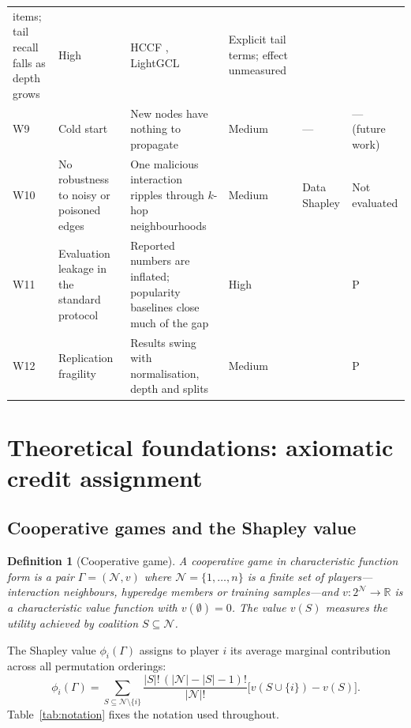 \documentclass[a4paper,fleqn,longmktitle]{cas-dc}
\newtheorem{definition}{Definition}
\begin{document}
\begin{table}[t]
\begin{tabular}{llp{6.5cm}lp{3.0cm}l}
items; tail recall falls as depth grows & High & HCCF \citep{xia2022hccf},
LightGCL \citep{cai2023lightgcl} & Explicit tail terms; effect unmeasured \\
W9 & Cold start & New nodes have nothing to propagate & Medium & ---
& --- (future work) \\
W10 & No robustness to noisy or poisoned edges & One malicious interaction
ripples through $k$-hop neighbourhoods & Medium & Data Shapley
\citep{ghorbani2019datashapley} & Not evaluated \\
W11 & Evaluation leakage in the standard protocol & Reported numbers are
inflated; popularity baselines close much of the gap & High &
\citep{dacrema2019worrying} & P \\
W12 & Replication fragility & Results swing with normalisation, depth and
splits & Medium & \citep{peska2023lightgcn} & P \\
\bottomrule
\end{tabular}
\end{table}

\section{Theoretical foundations: axiomatic credit assignment}
\label{sec:theory}

\subsection{Cooperative games and the Shapley value}
\label{sec:coopgame}

\begin{definition}[Cooperative game]
\label{def:game}
A cooperative game in characteristic function form is a pair $\Gamma =
(\mathcal{N}, v)$ where $\mathcal{N} = \{1,\dots,n\}$ is a finite set of
players---interaction neighbours, hyperedge members or training samples---and
$v : 2^{\mathcal{N}} \to \mathbb{R}$ is a characteristic value function with
$v(\emptyset) = 0$. The value $v(S)$ measures the utility achieved by coalition
$S \subseteq \mathcal{N}$.
\end{definition}

The Shapley value $\phi_i(\Gamma)$ assigns to player $i$ its average marginal
contribution across all permutation orderings:
\begin{equation}
\phi_i(\Gamma) = \!\!\sum_{S \subseteq \mathcal{N} \setminus \{i\}}\!\!
\frac{|S|!\,(|\mathcal{N}| - |S| - 1)!}{|\mathcal{N}|!}
\bigl[ v(S \cup \{i\}) - v(S) \bigr].
\label{eq:shapley}
\end{equation}
Table~\ref{tab:notation} fixes the notation used throughout.
\end{document}
